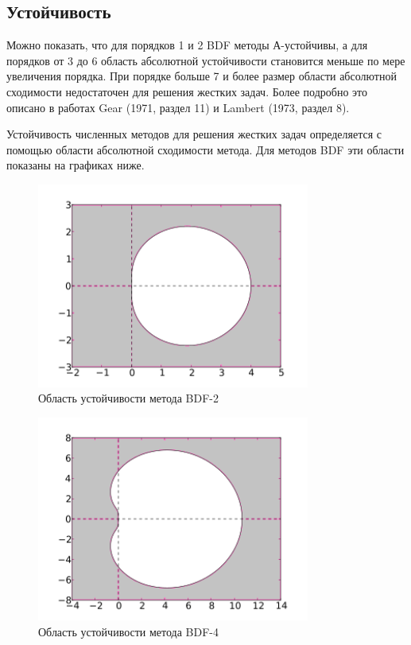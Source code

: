 \documentclass[12pt, a4paper]{article}
\begin{document}
\subsection{Устойчивость}

Можно показать, что для порядков 1 и 2 BDF методы А-устойчивы, а для порядков от 3 до 6 область абсолютной устойчивости становится меньше по мере увеличения порядка. При порядке больше 7 и более размер области абсолютной сходимости недостаточен для решения жестких задач. Более подробно это описано в работах Gear (1971, раздел 11) и Lambert (1973, раздел 8).

Устойчивость численных методов для решения жестких задач определяется с помощью области абсолютной сходимости метода. Для методов BDF эти области показаны на графиках ниже.

\begin{figure}[!htbp]
	\centering
	\includegraphics[width=0.8\textwidth]{330px-Stability_region_for_BDF2}%
	\caption{Область устойчивости метода BDF-2~\cite{intr-cambridge}}
	\vspace*{-2mm}
	\label{ser_graph}
\end{figure}

\begin{figure}[!htbp]
	\centering
	\includegraphics[width=0.8\textwidth]{330px-Stability_region_for_BDF4}%
	\caption{Область устойчивости метода BDF-4~\cite{intr-cambridge}}
	\vspace*{-2mm}
	\label{ser_graph}
\end{figure}
\end{document}

